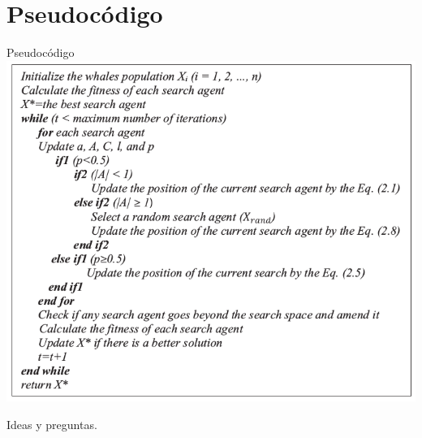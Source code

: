 \documentclass[10pt]{beamer}
\begin{document}
\section{Pseudocódigo}

\begin{frame}[fragile]{Pseudocódigo}
	\includegraphics[scale=0.4]{./Imagenes/imagen4.png}
\end{frame}

\begin{frame}[standout]
	\huge Ideas y preguntas.
\end{frame}
\end{document}
